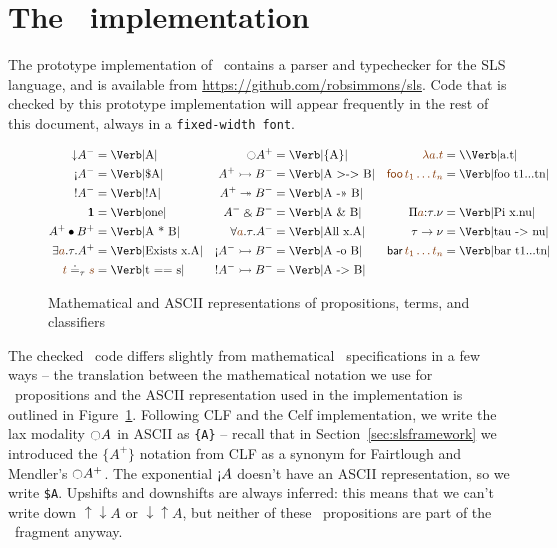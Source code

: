 \section{The \sls~implementation}
\label{sec:prototype}

The prototype implementation of \sls~contains a parser and typechecker
for the SLS language, and is available from
\url{https://github.com/robsimmons/sls}. Code that is checked by this
prototype implementation will appear frequently in the rest of this
document, always in a \verb|fixed-width font|.

\begin{figure}
\newcommand{\thingamajig}{=}
\begin{align*}
{\downarrow}A^- & \thingamajig \mbox{\Verb|A|} 
 & {\ocircle}A^+ & \thingamajig \mbox{\Verb|\{A\}|}
 & \lf{\lambda a.t} & \thingamajig \mbox{{\texttt{\char`\\}}\Verb|a.t|}
\\
{\gnab}A^- & \thingamajig \mbox{\Verb|\$A|}
 & A^+ \lefti B^- & \thingamajig \mbox{\Verb|A >-> B|}
 & \lf{{\sf foo}\,t_1\ldots t_n} & \thingamajig \mbox{\Verb|foo t1...tn|}
\\
{!}A^- & \thingamajig \mbox{\Verb|!A|}
 & A^+ \righti B^- & \thingamajig \mbox{\Verb|A ->> B|}
\\
\one & \thingamajig \mbox{\Verb|one|}
 & A^- \with B^- & \thingamajig \mbox{\Verb|A \& B|}
 & \Pi\lf{a}{:}\tau.\nu & \thingamajig \mbox{\Verb|Pi x.nu|}
\\
A^+ \fuse B^+ & \thingamajig \mbox{\Verb|A * B|}
 & \forall \lf{a}.\tau. A^- & \thingamajig \mbox{\Verb|All x.A|}
 & \tau \rightarrow \nu & \thingamajig{\mbox{\Verb|tau -> nu|}}
\\
\exists \lf{a}.\tau. A^+ & \thingamajig \mbox{\Verb|Exists x.A|}
 & {\gnab}A^- \lefti B^- & \thingamajig \mbox{\Verb|A -o B|}
 & {\sf bar}\,\lf{t_1 \ldots t_n} & \thingamajig{\mbox{\Verb|bar t1...tn|}}
\\
\lf{t} \doteq_\tau \lf{s} & \thingamajig \mbox{\Verb|t == s|}
 & {!}A^- \lefti B^- & \thingamajig \mbox{\Verb|A -> B|}
\end{align*}
\caption{Mathematical and ASCII representations of propositions,
  terms, and classifiers}
\label{fig:translate-types}
\end{figure}


The checked \sls~code differs slightly from mathematical
\sls~specifications in a few ways -- the translation between the
mathematical notation we use for \sls~propositions and the ASCII
representation used in the implementation is outlined in
Figure~\ref{fig:translate-types}.  Following CLF and the Celf
implementation, we write the lax modality ${\ocircle}A$ in ASCII as
\verb|{A}| -- recall that in Section~\ref{sec:slsframework} we
introduced the $\{ A^+ \}$ notation from CLF as a synonym for
Fairtlough and Mendler's ${\ocircle}A^+$.  The exponential ${\gnab}A$
doesn't have an ASCII representation, so we write \verb|$A|.
Upshifts and downshifts are always inferred: this means
that we can't write down ${\uparrow}{\downarrow}A$ or
${\downarrow}{\uparrow}A$, but neither of these \ollll~propositions
are part of the \sls~fragment anyway.

